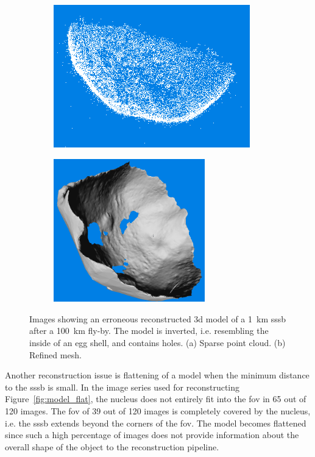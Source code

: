 \begin{figure}[htb]
    \centering
        \begin{subfigure}[b]{0.42\textwidth}
            \centering
            \includegraphics[width=\textwidth,height=6.2cm]{doc/thesis/0_figures/models_quality/broken/broken_points1.png}
            \caption{} %
            \label{fig:models_broken_points}
        \end{subfigure}
        \begin{subfigure}[b]{0.42\textwidth}
            \centering
            \includegraphics[width=\textwidth,height=6.2cm]{doc/thesis/0_figures/models_quality/broken/broken_refine2.png}
            \caption{}
            \label{fig:models_broken_mesh}
        \end{subfigure}
    \caption{Images showing an erroneous reconstructed \gls{3d} model of a \SI{1}{\kilo\meter} \gls{sssb} after a \SI{100}{\kilo\meter} fly-by. The model is inverted, i.e. resembling the inside of an egg shell, and contains holes. (a) Sparse point cloud. (b) Refined mesh.}
    \label{fig:models_broken}
\end{figure}

Another reconstruction issue is flattening of a model when the minimum distance to the \gls{sssb} is small. In the image series used for reconstructing Figure~\ref{fig:model_flat}, the nucleus does not entirely fit into the \gls{fov} in \SI{65}{} out of \SI{120}{} images. The \gls{fov} of \SI{39}{} out of \SI{120}{} images is completely covered by the nucleus, i.e. the \gls{sssb} extends beyond the corners of the \gls{fov}. The model becomes flattened since such a high percentage of images does not provide information about the overall shape of the object to the reconstruction pipeline.

